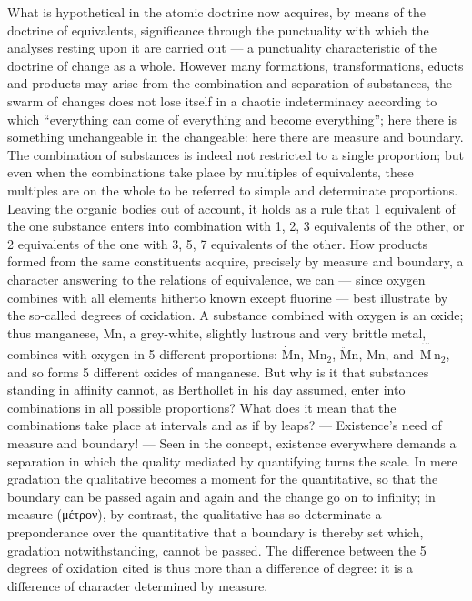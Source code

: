 \documentclass[12pt,a4paper]{book}
\begin{document}
What is hypothetical in the atomic doctrine now acquires, by means of the
doctrine of equivalents, significance through the punctuality with which the
analyses resting upon it are carried out --- a punctuality characteristic of
the doctrine of change as a whole. However many formations, transformations,
educts and products may arise from the combination and separation of
substances, the swarm of changes does not lose itself in a chaotic
indeterminacy according to which ``everything can come of everything and become
everything''; here there is something unchangeable in the changeable: here
there are measure and boundary. The combination of substances is indeed not
restricted to a single proportion; but even when the combinations take place by
multiples of equivalents, these multiples are on the whole to be referred to
simple and determinate proportions. Leaving the organic bodies out of account,
it holds as a rule that 1 equivalent of the one substance enters into
combination with 1, 2, 3 equivalents of the other, or 2 equivalents of the one
with 3, 5, 7 equivalents of the other. How products formed from the same
constituents acquire, precisely by measure and boundary, a character answering
to the relations of equivalence, we can --- since oxygen
\setcounter{footnote}{0}
combines with all elements hitherto known except fluorine --- best illustrate
by the so-called degrees of oxidation. A substance combined with oxygen is an
oxide; thus manganese, $\mathrm{Mn}$, a grey-white, slightly lustrous and very
brittle metal, combines with oxygen in 5 different proportions:
$\dot{\mathrm{M}}\mathrm{n}$,
$\stackrel{\cdot\cdot\cdot}{\mathrm{M}}\mathrm{n}_2$,
$\ddot{\mathrm{M}}\mathrm{n}$,
$\stackrel{\cdot\cdot\cdot}{\mathrm{M}}\mathrm{n}$, and
$\stackrel{\stackrel{\cdot\cdot\cdot}{\cdot\cdot\cdot\cdot}}{\mathrm{M}}\mathrm{n}_2$,
and so forms 5 different oxides of manganese. But why is it that substances
standing in affinity cannot, as Berthollet in his day assumed, enter into
combinations in all possible proportions? What does it mean that the
combinations take place at intervals and as if by leaps? --- Existence's need
of measure and boundary! --- Seen in the concept, existence everywhere demands
a separation in which the quality mediated by quantifying turns the scale. In
mere gradation the qualitative becomes a moment for the quantitative, so that
the boundary can be passed again and again and the change go on to infinity; in
measure (μέτρον), by contrast, the qualitative has so determinate a
preponderance over the quantitative that a boundary is thereby set which,
gradation notwithstanding, cannot be passed. The difference between the 5
degrees of oxidation cited is thus more than a difference of degree: it is a
difference of character determined by measure.
\end{document}
